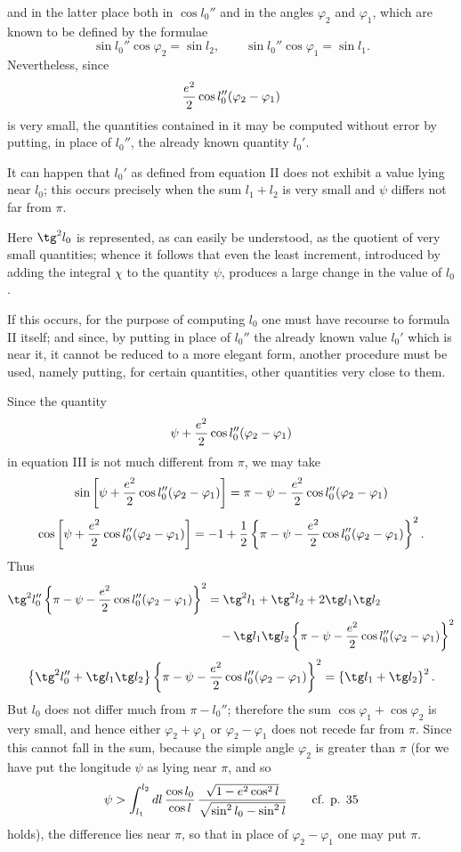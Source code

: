 \begingroup\small
and in the latter place both in $\cos l_0''$ and in the angles $\varphi_2$ and $\varphi_1$, which are known to be defined by the formulae
\[
 \sin l_0''\cos\varphi_2=\sin l_2,
 \qquad
 \sin l_0''\cos\varphi_1=\sin l_1.
\]
Nevertheless, since
\[
 {e^2\over2}\cos l_0''(\varphi_2-\varphi_1)
\]
is very small, the quantities contained in it may be computed without error by putting, in place of $l_0''$, the already known quantity $l_0'$.

It can happen that $l_0'$ as defined from equation II does not exhibit a value lying near $l_0$; this occurs precisely when the sum $l_1+l_2$ is very small and $\psi$ differs not far from $\pi$.

Here $\tg^2l_0$ is represented, as can easily be understood, as the quotient of very small quantities; whence it follows that even the least increment, introduced by adding the integral $\chi$ to the quantity $\psi$, produces a large change in the value of $l_0$.

If this occurs, for the purpose of computing $l_0$ one must have recourse to formula II itself; and since, by putting in place of $l_0''$ the already known value $l_0'$ which is near it, it cannot be reduced to a more elegant form, another procedure must be used, namely putting, for certain quantities, other quantities very close to them.

Since the quantity
\[
 \psi+{e^2\over2}\cos l_0''(\varphi_2-\varphi_1)
\]
in equation III is not much different from $\pi$, we may take
\[
 \sin\left[\psi+{e^2\over2}\cos l_0''(\varphi_2-\varphi_1)\right]
=\pi-\psi-{e^2\over2}\cos l_0''(\varphi_2-\varphi_1)
\]
\[
 \cos\left[\psi+{e^2\over2}\cos l_0''(\varphi_2-\varphi_1)\right]
=-1+{1\over2}\left\{\pi-\psi-{e^2\over2}\cos l_0''(\varphi_2-\varphi_1)\right\}^2.
\]
Thus
\[
\begin{aligned}
\tg^2l_0''\left\{\pi-\psi-{e^2\over2}\cos l_0''(\varphi_2-\varphi_1)\right\}^2
&=\tg^2l_1+\tg^2l_2+2\tg l_1\tg l_2\\
&\quad-\tg l_1\tg l_2\left\{\pi-\psi-{e^2\over2}\cos l_0''(\varphi_2-\varphi_1)\right\}^2
\end{aligned}
\]
\[
\left\{\tg^2l_0''+\tg l_1\tg l_2\right\}\left\{\pi-\psi-{e^2\over2}\cos l_0''(\varphi_2-\varphi_1)\right\}^2
=\left\{\tg l_1+\tg l_2\right\}^2.
\]
But $l_0$ does not differ much from $\pi-l_0''$; therefore the sum $\cos\varphi_1+
\cos\varphi_2$ is very small, and hence either $\varphi_2+\varphi_1$ or $\varphi_2-\varphi_1$ does not recede far from $\pi$. Since this cannot fall in the sum, because the simple angle $\varphi_2$ is greater than $\pi$ (for we have put the longitude $\psi$ as lying near $\pi$, and so
\[
\psi>\int_{l_1}^{l_2} dl\,{\cos l_0\over\cos l}\,{\sqrt{1-e^2\cos^2l}\over\sqrt{\sin^2l_0-\sin^2l}}
\qquad \text{cf. p. 35}
\]
holds), the difference  lies near $\pi$, so that in place of $\varphi_2-\varphi_1$ one may put $\pi$.
\endgroup
